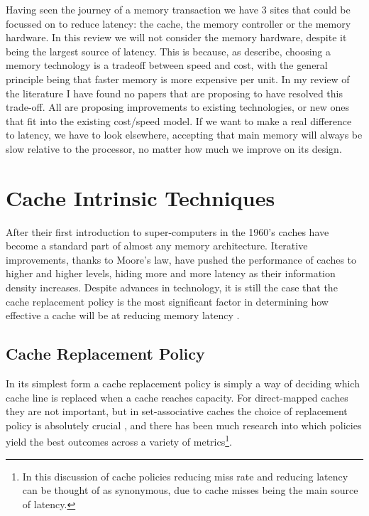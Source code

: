 Having seen the journey of a memory transaction we have 3 sites that could be focussed on to reduce latency: the cache, the memory controller or the memory hardware. In this review we will not consider the memory hardware, despite it being the largest source of latency. This is because, as \citet{pattersonComputerOrganizationDesign2018} describe, choosing a memory technology is a tradeoff between speed and cost, with the general principle being that faster memory is more expensive per unit. In my review of the literature I have found no papers that are proposing to have resolved this trade-off. All are proposing improvements to existing technologies, or new ones that fit into the existing cost/speed model. If we want to make a real difference to latency, we have to look elsewhere, accepting that main memory will always be slow relative to the processor, no matter how much we improve on its design.

\section{Cache Intrinsic Techniques}

\label{sec:cache}

After their first introduction to super-computers in the 1960's \cite{pattersonComputerOrganizationDesign2018} caches have become a standard part of almost any memory architecture. Iterative improvements, thanks to Moore's law, have pushed the performance of caches to higher and higher levels, hiding more and more latency as their information density increases. Despite advances in technology, it is still the case that the cache replacement policy is the most significant factor in determining how effective a cache will be at reducing memory latency \cite{hennessyComputerArchitectureQuantitative2019}.

\subsection{Cache Replacement Policy}
\label{sec:replacement_policy}

In its simplest form a cache replacement policy is simply a way of deciding which cache line is replaced when a cache reaches capacity. For direct-mapped caches they are not important, but in set-associative caches the choice of replacement policy is absolutely crucial \cite{hennessyComputerArchitectureQuantitative2019}, and there has been much research into which policies yield the best outcomes across a variety of metrics\footnote{In this discussion of cache policies reducing miss rate and reducing latency can be thought of as synonymous, due to cache misses being the main source of latency.}.

